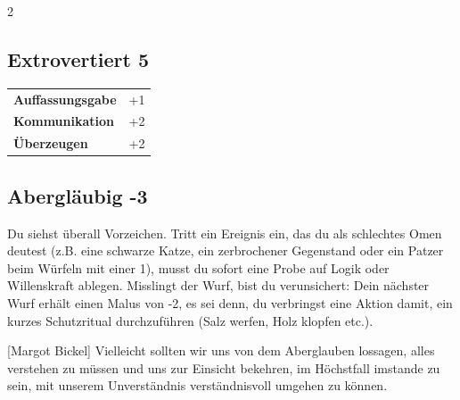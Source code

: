 \begin{multicols}{2}
\begin{tcolorbox}

\end{tcolorbox}

\begin{tcolorbox}
    \subsection*{Extrovertiert \hfill \small{5 }}
    \tcblower




\begin{tabular}{@{}ll@{}}
    \textbf{Auffassungsgabe} & +1\\
    \textbf{Kommunikation} & +2\\
    \textbf{Überzeugen} & +2\\
\end{tabular}


\end{tcolorbox}

\begin{tcolorbox}
    \subsection*{Abergläubig \hfill \small{-3 }}
    \tcblower
Du siehst überall Vorzeichen. Tritt ein Ereignis ein, das du als schlechtes Omen deutest (z.B. eine schwarze Katze, ein zerbrochener Gegenstand oder ein Patzer beim Würfeln mit einer 1), musst du sofort eine Probe auf Logik oder Willenskraft ablegen. Misslingt der Wurf, bist du verunsichert: Dein nächster Wurf erhält einen Malus von -2, es sei denn, du verbringst eine Aktion damit, ein kurzes Schutzritual durchzuführen (Salz werfen, Holz klopfen etc.).

\begin{pquote}{[Margot Bickel]}
Vielleicht sollten wir uns von dem Aberglauben lossagen, alles verstehen zu müssen und uns zur Einsicht bekehren, im Höchstfall imstande zu sein, mit unserem Unverständnis verständnisvoll umgehen zu können.
\end{pquote}


\end{tcolorbox}
\end{multicols}
